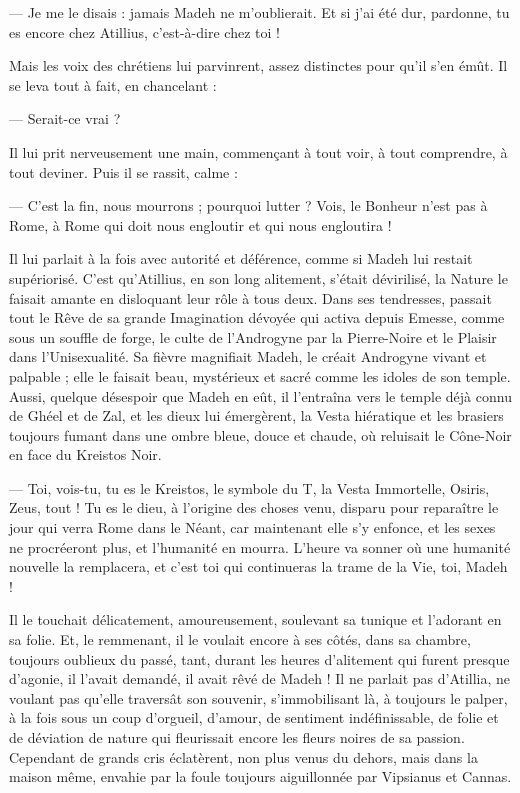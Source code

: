 \documentclass[a4paper, 11pt, oneside, polutonikogreek, french]{article}
\begin{document}
--- Je me le disais : jamais Madeh ne m'oublierait. Et si j'ai été dur, pardonne, tu es encore chez Atillius, c'est-à-dire chez toi !

Mais les voix des chrétiens lui parvinrent, assez distinctes pour qu'il s'en émût. Il se leva tout à fait, en chancelant :

--- Serait-ce vrai ?

Il lui prit nerveusement une main, commençant à tout voir, à tout comprendre, à tout deviner. Puis il se rassit, calme :

--- C'est la fin, nous mourrons ; pourquoi lutter ? Vois, le Bonheur n'est pas à Rome, à Rome qui doit nous engloutir et qui nous engloutira !

Il lui parlait à la fois avec autorité et déférence, comme si Madeh lui restait supériorisé. C'est qu'Atillius, en son long alitement, s'était dévirilisé, la Nature le faisait amante en disloquant leur rôle à tous deux. Dans ses tendresses, passait tout le Rêve de sa grande Imagination dévoyée qui activa depuis Emesse, comme sous un souffle de forge, le culte de l'Androgyne par la Pierre-Noire et le Plaisir dans l'Unisexualité. Sa fièvre magnifiait Madeh, le créait Androgyne vivant et palpable ; elle le faisait beau, mystérieux et sacré comme les idoles de son temple. Aussi, quelque désespoir que Madeh en eût, il l'entraîna vers le temple déjà connu de Ghéel et de Zal, et les dieux lui émergèrent, la Vesta hiératique et les brasiers toujours fumant dans une ombre bleue, douce et chaude, où reluisait le Cône-Noir en face du Kreistos Noir.

--- Toi, vois-tu, tu es le Kreistos, le symbole du T, la Vesta Immortelle, Osiris, Zeus, tout ! Tu es le dieu, à l'origine des choses venu, disparu pour reparaître le jour qui verra Rome dans le Néant, car maintenant elle s'y enfonce, et les sexes ne procréeront plus, et l'humanité en mourra. L'heure va sonner où une humanité nouvelle la remplacera, et c'est toi qui continueras la trame de la Vie, toi, Madeh !

Il le touchait délicatement, amoureusement, soulevant sa tunique et l'adorant en sa folie. Et, le remmenant, il le voulait encore à ses côtés, dans sa chambre, toujours oublieux du passé, tant, durant les heures d'alitement qui furent presque d'agonie, il l'avait demandé, il avait rêvé de Madeh ! Il ne parlait pas d'Atillia, ne voulant pas qu'elle traversât son souvenir, s'immobilisant là, à toujours le palper, à la fois sous un coup d'orgueil, d'amour, de sentiment indéfinissable, de folie et de déviation de nature qui fleurissait encore les fleurs noires de sa passion. Cependant de grands cris éclatèrent, non plus venus du dehors, mais dans la maison même, envahie par la foule toujours aiguillonnée par Vipsianus et Cannas.
\end{document}
